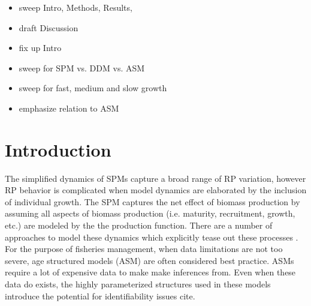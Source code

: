 %
\newcommand{\kr}{ \frac{\kappa w_\infty}{w(a_s)} }
\newcommand{\one}{
        \left(\frac{Z(Z+\kappa)}{\alpha w(a_s)(Z+\kr)}\right)^\gamma
}
\newcommand{\two}{
        \left(\frac{\gamma F}{\alpha w(a_s)}\right) \left(\frac{Z(Z+\kappa)}{\alpha w(a_s)(Z+\kr)}\right)^{\gamma-1}
}
\newcommand{\thr}{
        \frac{\left(\kr\right)\left(\kappa-\kr\right)}{(Z+\kr)^2}
}
%
\newcommand{\oneA}{
        \left(\frac{Z^*(Z^*+\kappa)}{w(a_s)(Z^*+\kr)}\right)^\gamma
}
\newcommand{\twoA}{
        \left(\frac{\gamma F^*}{w(a_s)}\right) \left(\frac{Z^*(Z^*+\kappa)}{w(a_s)(Z^*+\kr)}\right)^{\gamma-1}
}
\newcommand{\thrA}{
        \frac{\left(\kr\right)\left(\kappa-\kr\right)}{(Z^*+\kr)^2}
}



\begin{itemize}
\item sweep Intro, Methods, Results, 
\item draft Discussion
\item fix up Intro
\item sweep for SPM vs. DDM vs. ASM
\item sweep for fast, medium and slow growth
\item emphasize relation to ASM
\end{itemize}

%
\section{Introduction}

%
The simplified dynamics of SPMs capture a broad range of RP variation, however
RP behavior is complicated when model dynamics are elaborated by the 
inclusion of individual growth. 
The SPM captures the net effect of biomass production by assuming all aspects 
of biomass production (i.e. maturity, recruitment, growth, etc.) are modeled by the %
the production function. There are a number of %
approaches to model these dynamics which explicitly tease out these processes \cite{quinn_quantitative_1999, hilborn_quantitative_1992}. 
For the purpose of fisheries management, when data limitations are not too severe, %
age structured models (ASM) \cite{methot_stock_2013} are often considered best practice.
ASMs require a lot of expensive data to make make inferences from. Even when these data do exists, 
the highly parameterized structures used in these models introduce the potential for identifiability 
issues {\color{red} cite}.

